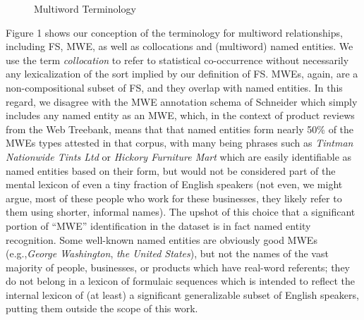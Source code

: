 \documentclass[11pt]{article}
\makeatletter
\def \eg {e.g.,\@ }
\makeatother
\begin{document}
\begin{figure}[!t]
\caption{Multiword Terminology}

\end{figure}

Figure 1 shows our conception of the terminology for multiword relationships, including FS, MWE, as well as collocations and (multiword) named entities. We use the term \textit{collocation} to refer to statistical co-occurrence without necessarily any lexicalization of the sort implied by our definition of FS. MWEs, again, are a non-compositional subset of FS, and they overlap with named entities. In this regard, we disagree with the MWE annotation schema of Schneider \cite{Schneider14a} which simply includes any named entity as an MWE, which, in the context of product reviews from the Web Treebank, means that that named entities form nearly 50\% of the MWEs types attested in that corpus, with many being phrases such as \textit{Tintman Nationwide Tints Ltd} or \textit{Hickory Furniture Mart} which are easily identifiable as named entities based on their form, but would not be considered part of the mental lexicon of even a tiny fraction of English speakers (not even, we might argue, most of these people who work for these businesses, they likely refer to them using shorter, informal names). The upshot of this choice that a significant portion of ``MWE'' identification in the dataset is in fact named entity recognition. Some well-known named entities are obviously good MWEs (\eg \textit{George Washington}, \textit{the United States}), but not the names of the vast majority of people, businesses, or products which have real-word referents; they do not belong in a lexicon of formulaic sequences which is intended to reflect the internal lexicon of (at least) a significant generalizable subset of English speakers, putting them outside the scope of this work.
\end{document}
